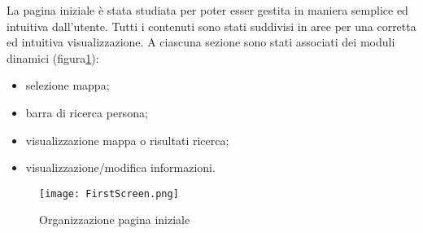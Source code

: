 La pagina iniziale è stata studiata per poter esser gestita in maniera semplice ed intuitiva dall'utente.  Tutti i contenuti sono stati suddivisi in aree  per  una  corretta  ed  intuitiva  visualizzazione. 
A  ciascuna sezione   sono   stati associati dei moduli dinamici (figura\ref{Screen:first}):

\begin{itemize}
\item selezione mappa;
\item barra di ricerca persona;
\item visualizzazione mappa o risultati ricerca;
\item visualizzazione/modifica informazioni.
\end{itemize}

\FloatBarrier
\begin{figure}[!htb]
\centering%
\texttt{[image: FirstScreen.png]}%
\caption{Organizzazione pagina iniziale}\label{Screen:first}%
\end{figure}